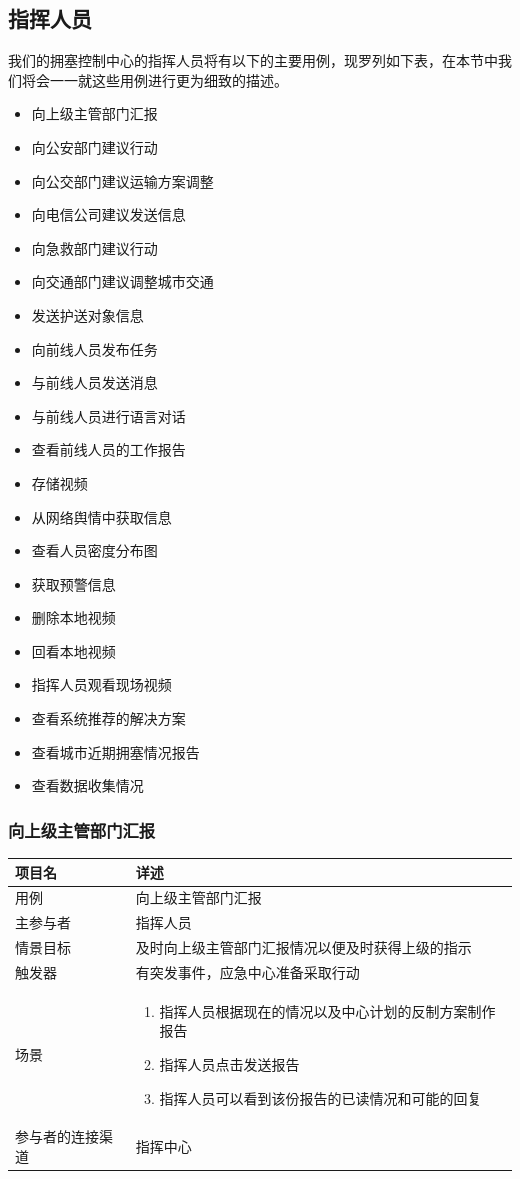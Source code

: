 \documentclass{ctexrep}
\begin{document}
\subsection{指挥人员}
我们的拥塞控制中心的指挥人员将有以下的主要用例，现罗列如下表，在本节中我们将会一一就这些用例进行更为细致的描述。
\begin{itemize}
\item 向上级主管部门汇报
\item 向公安部门建议行动
\item 向公交部门建议运输方案调整
\item 向电信公司建议发送信息
\item 向急救部门建议行动
\item 向交通部门建议调整城市交通
\item 发送护送对象信息
\item 向前线人员发布任务
\item 与前线人员发送消息
\item 与前线人员进行语言对话
\item 查看前线人员的工作报告
\item 存储视频
\item 从网络舆情中获取信息
\item 查看人员密度分布图
\item 获取预警信息
\item 删除本地视频
\item 回看本地视频
\item 指挥人员观看现场视频
\item 查看系统推荐的解决方案
\item 查看城市近期拥塞情况报告
\item 查看数据收集情况 
\end{itemize}
\subsubsection{向上级主管部门汇报}
\begin{longtable}{p{2cm} | p{10cm}}
\hline
项目名 & 详述 \\
\hline
\hline
用例 & 向上级主管部门汇报\\
\hline
主参与者 & 指挥人员 \\
\hline
情景目标 &  及时向上级主管部门汇报情况以便及时获得上级的指示\\
\hline
触发器 & 有突发事件，应急中心准备采取行动\\
\hline
场景 & \begin{enumerate}
	\item 指挥人员根据现在的情况以及中心计划的反制方案制作报告
	\item 指挥人员点击发送报告
	\item 指挥人员可以看到该份报告的已读情况和可能的回复
\end{enumerate} \\
\hline
参与者的连接渠道 & 指挥中心 \\
\hline
\end{longtable}
\end{document}
